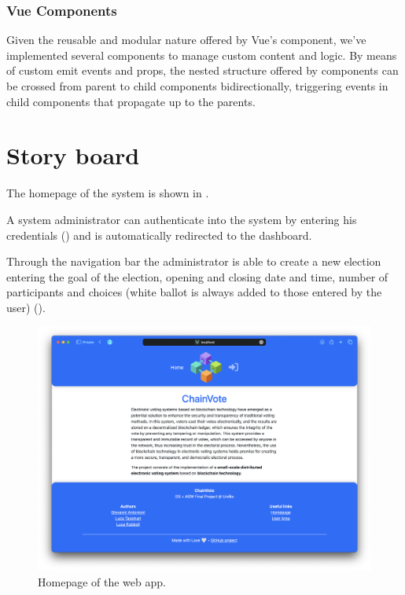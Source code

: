 \documentclass{scrartcl}
\begin{document}
\subsubsection{Vue Components}

Given the reusable and modular nature offered by Vue's component, we've implemented several components to manage custom content and logic.
By means of custom emit events and props, the nested structure offered by components can be crossed from parent to child components bidirectionally, triggering events in child components that propagate up to the parents.

\section{Story board}

The homepage of the system is shown in .

A system administrator can authenticate into the system by entering his credentials () and is automatically redirected to the dashboard.

Through the navigation bar the administrator is able to create a new election entering the goal of the election, opening and closing date and time, number of participants and choices (white ballot is always added to those entered by the user) ().

\begin{figure}
    \centering
    \includegraphics[width=0.9\linewidth]{figures/story-board/1-index.png}
    \caption{Homepage of the web app.}
    \label{fig:homepage}
\end{figure}
\end{document}
